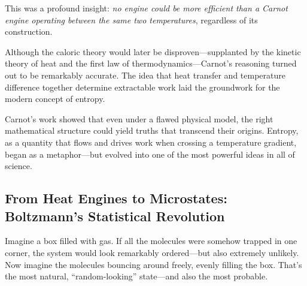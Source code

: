 This was a profound insight: \emph{no engine could be more efficient than a Carnot engine operating between the same two temperatures}, regardless of its construction.










Although the caloric theory would later be disproven—supplanted by the kinetic theory of heat and the first law of thermodynamics—Carnot’s reasoning turned out to be remarkably accurate. The idea that heat transfer and temperature difference together determine extractable work laid the groundwork for the modern concept of entropy.

Carnot’s work showed that even under a flawed physical model, the right mathematical structure could yield truths that transcend their origins. Entropy, as a quantity that flows and drives work when crossing a temperature gradient, began as a metaphor—but evolved into one of the most powerful ideas in all of science.






\subsection{From Heat Engines to Microstates: Boltzmann’s Statistical Revolution}

Imagine a box filled with gas. If all the molecules were somehow trapped in one corner, the system would look remarkably ordered—but also extremely unlikely. Now imagine the molecules bouncing around freely, evenly filling the box. That’s the most natural, “random-looking” state—and also the most probable.

